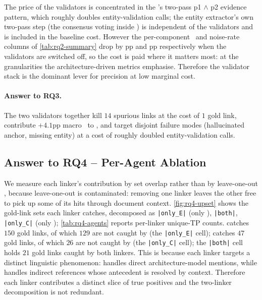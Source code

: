 The price of the validators is concentrated in the \entValidator{}'s two-pass p1 \ensuremath{\wedge} p2 evidence pattern, which roughly doubles entity-validation calls; the entity extractor's own two-pass step (the consensus voting inside \fullVariant{}) is independent of the validators and is included in the baseline cost.
However the per-component \fone\ and noise-rate columns of \autoref{tab:rq2-summary} drop by pp and pp respectively when the validators are switched off, so the cost is paid where it matters most: at the granularities the architecture-driven metrics emphasise.
Therefore the validator stack is the dominant lever for precision at low marginal cost.

\begin{rqanswer}
\paragraph{Answer to RQ3.}
The two validators together kill $14$ spurious links at the cost of $1$ gold link, contribute $+4.1$pp macro \fone\ to \fullVariant{}, and target disjoint failure modes (hallucinated anchor, missing entity) at a cost of roughly doubled entity-validation calls.
\end{rqanswer}

\subsection{Answer to RQ4 -- Per-Agent Ablation}
\label{sec:results:rq4}




We measure each linker's contribution by set overlap rather than by leave-one-out \fone, because leave-one-out is contaminated: removing one linker leaves the other free to pick up some of its hits through document context.
\autoref{fig:rq4-upset} shows the gold-link sets each linker catches, decomposed as \texttt{|only\_E|} (only \linkerB{}), \texttt{|both|}, \texttt{|only\_C|} (only \linkerC{}); \autoref{tab:rq4-agents} reports per-linker unique-TP counts.
\linkerB{} catches $150$ gold links, of which $129$ are not caught by \linkerC{} (the \texttt{|only\_E|} cell); \linkerC{} catches $47$ gold links, of which $26$ are not caught by \linkerB{} (the \texttt{|only\_C|} cell); the \texttt{|both|} cell holds $21$ gold links caught by both linkers.
This is because each linker targets a distinct linguistic phenomenon: \linkerB{} handles direct architecture-model mentions, while \linkerC{} handles indirect references whose antecedent is resolved by context.
Therefore each linker contributes a distinct slice of true positives and the two-linker decomposition is not redundant.

